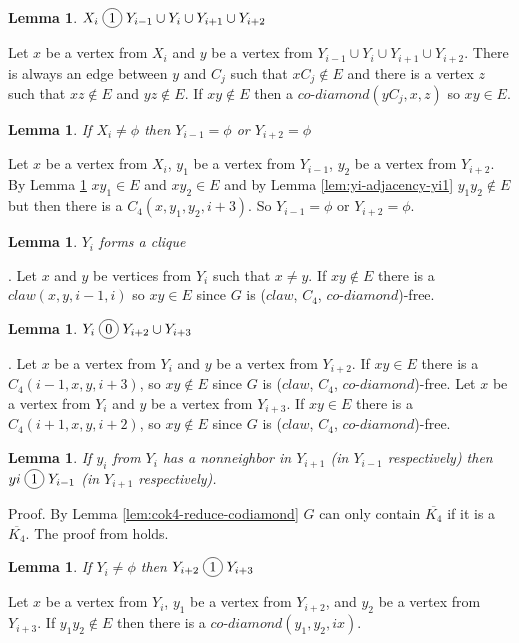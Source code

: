 \documentclass[12pt]{article}
\newcommand*\circled[1]{\tikz[baseline=(char.base)]{
            \node[shape=circle,draw,inner sep=2pt] (char) {#1};}}
\newtheorem{Lemma}[Theorem]{Lemma}
\def\CCD{($claw$, $C_4$, $co$-$diamond$)}
\begin{document}
\begin{Lemma}\label{lem:2k-join-3k}
$X_i \;\circled{1}\; Y_{i-1} \cup Y_{i} \cup Y_{i+1} \cup Y_{i+2}$ 
\end{Lemma}
 Let $x$ be a vertex from $X_i$ and $y$ be a vertex from $Y_{i-1} \cup Y_{i} \cup Y_{i+1} \cup Y_{i+2}$. There is always an edge between $y$ and $C_j$ such that $xC_j \not\in E$ and there is a vertex $z$ such that $xz \not \in E$ and $yz \not \in E$. If $xy \not \in E$ then a $co$-$diamond (yC_j, x, z)$ so $xy \in E$.

\begin{Lemma}\label{lem:Xi-Yi-noYi}
If $X_i \neq \phi$ then $Y_{i-1} =\phi$ or $Y_{i+2} = \phi$
\end{Lemma}
 Let $x$ be a vertex from $X_i$, $y_1$ be a vertex from $Y_{i-1}$, $y_2$ be a vertex from $Y_{i+2}$. By Lemma \ref{lem:2k-join-3k} $xy_1 \in E$ and $xy_2 \in E$ and by Lemma \ref{lem:yi-adjacency-yi1} $y_1y_2 \not \in E$ but then there is a $C_4 (x, y_1, y_2, i+3)$. So $Y_{i-1} = \phi$ or $Y_{i+2} = \phi$.

\begin{Lemma}\label{lem:3K-clique}
$Y_i$ forms a clique
\end{Lemma}
. Let $x$ and $y$ be vertices from $Y_i$ such that $x \neq y$. If $xy \not \in E$ there is a $claw (x, y, i-1, i)$ so $xy \in E$ since $G$ is {\CCD}-free.

\begin{Lemma}\label{lem:yi-adjacency-yi2}
$Y_i \;\circled{0}\; Y_{i+2} \cup Y_{i+3} $
\end{Lemma}
. Let $x$ be a vertex from $Y_i$ and $y$ be a vertex from $Y_{i+2}$. If $xy \in E$ there is a $C_4 (i-1, x, y, i+3)$, so $xy \not \in E$ since $G$ is {\CCD}-free. Let $x$ be a vertex from $Y_i$ and $y$ be a vertex from $Y_{i+3}$. If $xy \in E$ there is a $C_4 (i+1, x, y, i+2)$, so $xy \not \in E$ since $G$ is {\CCD}-free.

\begin{Lemma}\label{lem:yi-miss-two-neighbors}
If $y_i$ from $Y_i$ has a nonneighbor in $Y_{i+1}$ (in $Y_{i-1}$ respectively) then $yi \;\circled{1}\; Y_{i-1}$ (in $Y_{i+1}$ respectively).
\end{Lemma}
\noindent {\it} Proof. By Lemma \ref{lem:cok4-reduce-codiamond} $G$ can only contain $\overline{K_4}$ if it is a $\overline{K_4}$. The proof from \cite{BrEnLeLo} holds.

\begin{Lemma}\label{lem:yi-force-join}
If $Y_i \neq \phi$ then $Y_{i+2} \;\circled{1}\; Y_{i+3}$
\end{Lemma}
 Let $x$ be a vertex from $Y_i$, $y_1$ be a vertex from $Y_{i+2}$, and $y_2$ be a vertex from $Y_{i+3}$. If $y_1y_2\not\in E$ then there is a $co$-$diamond (y_1, y_2, ix)$. 
\end{document}
